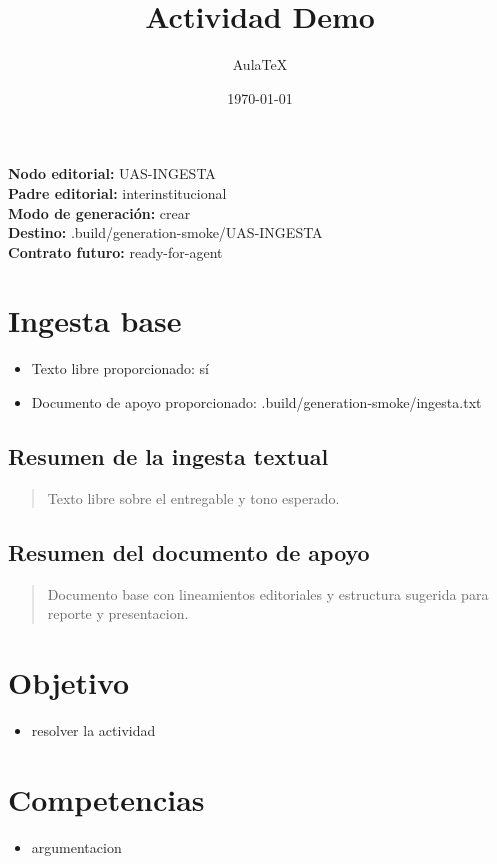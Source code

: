 \documentclass[12pt]{article}
\title{Actividad Demo}
\author{AulaTeX}
\date{\today}
\begin{document}
\maketitle

\noindent\textbf{Nodo editorial:} UAS-INGESTA\\
\textbf{Padre editorial:} interinstitucional\\
\textbf{Modo de generación:} crear\\
\textbf{Destino:} .build/generation-smoke/UAS-INGESTA\\
\textbf{Contrato futuro:} ready-for-agent

\section*{Ingesta base}
\begin{itemize}[leftmargin=*]
  \item Texto libre proporcionado: sí
  \item Documento de apoyo proporcionado: .build/generation-smoke/ingesta.txt
\end{itemize}

\subsection*{Resumen de la ingesta textual}
\begin{quote}
Texto libre sobre el entregable y tono esperado.
\end{quote}

\subsection*{Resumen del documento de apoyo}
\begin{quote}
Documento base con lineamientos editoriales y estructura sugerida para reporte y presentacion.
\end{quote}

\section*{Objetivo}
\begin{itemize}[leftmargin=*]
  \item resolver la actividad
\end{itemize}

\section*{Competencias}
\begin{itemize}[leftmargin=*]
  \item argumentacion
\end{itemize}
\end{document}

